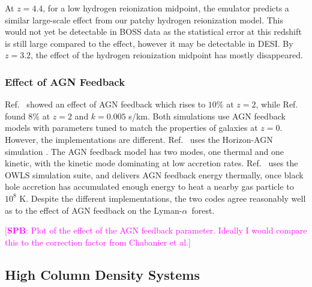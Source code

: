 \documentclass[a4paper,11pt]{article}
\newcommand{\spb}[1]{{\textcolor{magenta}{[{\bf SPB}: #1]}}}
\newcommand{\Lya}{Lyman-$\alpha$}
\begin{document}
At $z=4.4$, for a low hydrogen reionization midpoint, the emulator predicts a similar large-scale effect from our patchy hydrogen reionization model. This would not yet be detectable in BOSS data as the statistical error at this redshift is still large compared to the effect, however it may be detectable in DESI. By $z=3.2$, the effect of the hydrogen reionization midpoint has mostly disappeared.

\subsubsection{Effect of AGN Feedback}

Ref.~\cite{Viel:2013} showed an effect of AGN feedback which rises to $10\%$ at $z=2$, while Ref.~\cite{Chabanier:2020} found $8\%$ at $z=2$ and $k = 0.005$ s/km. Both simulations use AGN feedback models with parameters tuned to match the properties of galaxies at $z=0$. However, the implementations are different. Ref.~\cite{Chabanier:2020} uses the Horizon-AGN simulation \cite{Dubois:2016}. The AGN feedback model has two modes, one thermal and one kinetic, with the kinetic mode dominating at low accretion rates. Ref.~\cite{Viel:2013} uses the OWLS simulation suite, and delivers AGN feedback energy thermally, once black hole accretion has accumulated enough energy to heat a nearby gas particle to $10^8$ K. Despite the different implementations, the two codes agree reasonably well as to the effect of AGN feedback on the \Lya~forest.

\spb{Plot of the effect of the AGN feedback parameter. Ideally I would compare this to the correction factor from Chabanier et al.}

\subsection{High Column Density Systems}
\end{document}
